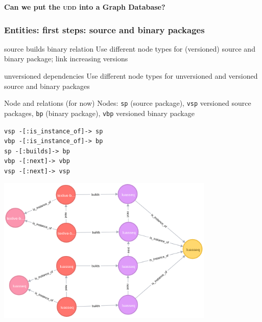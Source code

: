 \documentclass[hyperref]{beamer}
\newcommand{\acro}[1]{\textsc{\MakeLowercase{#1}}}
\newcommand{\cutin}[1]{%
\begin{frame}[c]\begin{center}{\Large\bf\color{myblue}#1}\end{center}\end{frame}}
\begin{document}
\cutin{Can we put the \acro{UDD} into a Graph Database?}

\begin{frame}
  \frametitle{Entities: first steps: source and binary packages}
  \begin{block}{source builds binary relation}
    Use different node types for (versioned) source and binary
    package; link increasing versions
  \end{block}

  \pause
  \begin{block}{unversioned dependencies}
    Use different node types for unversioned and versioned source and
    binary packages
  \end{block}

  \pause
  \begin{block}{Node and relations (for now)}
    Nodes: \texttt{sp} (source package), \texttt{vsp} versioned source
    packages, \texttt{bp} (binary package), \texttt{vbp} versioned
    binary package

    \medskip
    \begin{center}
      \texttt{vsp -[:is\_instance\_of]-> sp}\\
      \texttt{vbp -[:is\_instance\_of]-> bp}\\
      \texttt{sp -[:builds]-> bp}\\
      \texttt{vbp -[:next]-> vbp}\\
      \texttt{vsp -[:next]-> vsp}\\
    \end{center}
  \end{block}
\end{frame}

\begin{frame}
  \begin{center}
    \includegraphics[height=7cm]{simple-graph.png}
  \end{center}
\end{frame}
\end{document}
